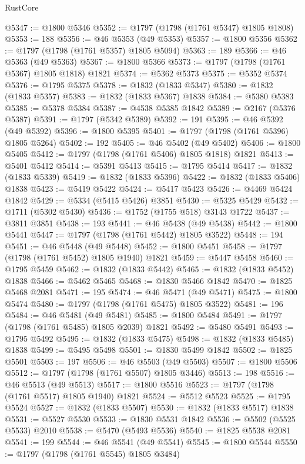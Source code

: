 \begin{lexlean}{RustCore}
\begin{coremodule}
@5347 := @1800 @5346
@5352 := @1797 (@1798 (@1761 @5347) @1805 @1808)
@5353 := 188
@5356 := @46 @5353 (@49 @5353)
@5357 := @1800 @5356
@5362 := @1797 (@1798 (@1761 @5357) @1805 @5094)
@5363 := 189
@5366 := @46 @5363 (@49 @5363)
@5367 := @1800 @5366
@5373 := @1797 (@1798 (@1761 @5367) @1805 @1818) @1821
@5374 := @5362 @5373
@5375 := @5352 @5374
@5376 := @1795 @5375
@5378 := @1832 (@1833 @5347)
@5380 := @1832 (@1833 @5357)
@5383 := @1832 (@1833 @5367) @1838
@5384 := @5380 @5383
@5385 := @5378 @5384
@5387 := @4538 @5385 @1842
@5389 := @2167 (@5376 @5387)
@5391 := @1797 (@5342 @5389)
@5392 := 191
@5395 := @46 @5392 (@49 @5392)
@5396 := @1800 @5395
@5401 := @1797 (@1798 (@1761 @5396) @1805 @5264)
@5402 := 192
@5405 := @46 @5402 (@49 @5402)
@5406 := @1800 @5405
@5412 := @1797 (@1798 (@1761 @5406) @1805 @1818) @1821
@5413 := @5401 @5412
@5414 := @5391 @5413
@5415 := @1795 @5414
@5417 := @1832 (@1833 @5339)
@5419 := @1832 (@1833 @5396)
@5422 := @1832 (@1833 @5406) @1838
@5423 := @5419 @5422
@5424 := @5417 @5423
@5426 := @4469 @5424 @1842
@5429 := @5334 (@5415 @5426) @3851
@5430 := @5325 @5429
@5432 := @1711 (@5302 @5430)
@5436 := @1752 (@1755 @518) @3143 @1722
@5437 := @3811 @3851
@5438 := 193
@5441 := @46 @5438 (@49 @5438)
@5442 := @1800 @5441
@5447 := @1797 (@1798 (@1761 @5442) @1805 @3522)
@5448 := 194
@5451 := @46 @5448 (@49 @5448)
@5452 := @1800 @5451
@5458 := @1797 (@1798 (@1761 @5452) @1805 @1940) @1821
@5459 := @5447 @5458
@5460 := @1795 @5459
@5462 := @1832 (@1833 @5442)
@5465 := @1832 (@1833 @5452) @1838
@5466 := @5462 @5465
@5468 := @1830 @5466 @1842
@5470 := @1825 @5468 @2081
@5471 := 195
@5474 := @46 @5471 (@49 @5471)
@5475 := @1800 @5474
@5480 := @1797 (@1798 (@1761 @5475) @1805 @3522)
@5481 := 196
@5484 := @46 @5481 (@49 @5481)
@5485 := @1800 @5484
@5491 := @1797 (@1798 (@1761 @5485) @1805 @2039) @1821
@5492 := @5480 @5491
@5493 := @1795 @5492
@5495 := @1832 (@1833 @5475)
@5498 := @1832 (@1833 @5485) @1838
@5499 := @5495 @5498
@5501 := @1830 @5499 @1842
@5502 := @1825 @5501
@5503 := 197
@5506 := @46 @5503 (@49 @5503)
@5507 := @1800 @5506
@5512 := @1797 (@1798 (@1761 @5507) @1805 @3446)
@5513 := 198
@5516 := @46 @5513 (@49 @5513)
@5517 := @1800 @5516
@5523 := @1797 (@1798 (@1761 @5517) @1805 @1940) @1821
@5524 := @5512 @5523
@5525 := @1795 @5524
@5527 := @1832 (@1833 @5507)
@5530 := @1832 (@1833 @5517) @1838
@5531 := @5527 @5530
@5533 := @1830 @5531 @1842
@5536 := @5502 (@5525 @5533) @2010
@5538 := @5470 (@5493 @5536)
@5540 := @1825 @5538 @2081
@5541 := 199
@5544 := @46 @5541 (@49 @5541)
@5545 := @1800 @5544
@5550 := @1797 (@1798 (@1761 @5545) @1805 @3484)

\end{coremodule}
\end{lexlean}
